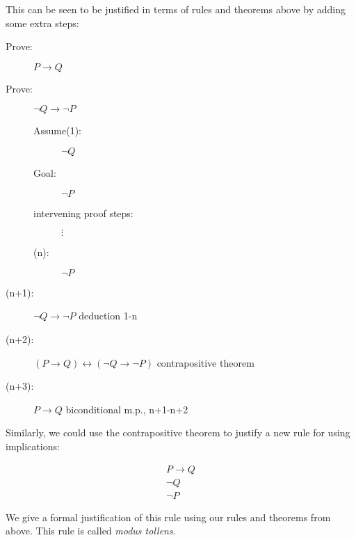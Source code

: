 \documentclass[12pt]{article}
\begin{document}
This can be seen to be justified in terms of rules and theorems above by adding some extra steps:

\begin{description}

\item[Prove:]  $P \rightarrow Q$

\item[Prove:]  $\neg Q \rightarrow \neg P$

\begin{description}

\item[Assume(1):] $\neg Q$

\item[Goal:]  $\neg P$

\item[intervening proof steps:]  $\vdots$

\item[(n):]  $\neg P$


\end{description}

\item[(n+1):]  $\neg Q \rightarrow \neg P$ deduction 1-n

\item[(n+2):]  $(P \rightarrow Q) \leftrightarrow (\neg Q \rightarrow \neg P)$  contrapositive theorem

\item[(n+3):]  $P \rightarrow Q$ biconditional m.p., n+1-n+2
\end{description}

Similarly, we could use the contrapositive theorem to justify a new rule for using implications:

$$\begin{array}{c}

P \rightarrow Q \\

\neg Q \\ \hline

\neg P

\end{array}$$

We give a formal justification of this rule using our rules and theorems from above.  This rule is called {\em modus tollens\/}.
\end{document}
